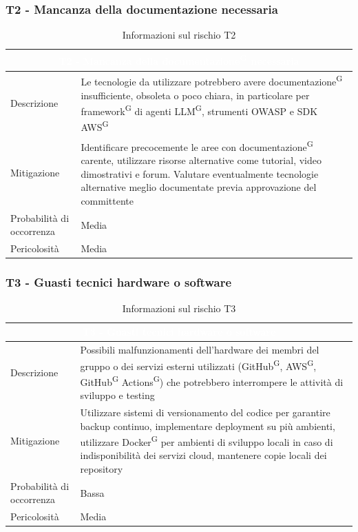 \documentclass[a4paper, 11pt]{article}
\begin{document}
\subsubsection{T2 - Mancanza della documentazione necessaria}
\begin{table}[H]
    \centering
    \begin{tabular}{|p{}|p{}|}
    	\hline
    	\multicolumn{2}{|c|}{\cellcolor{AccentColor}\textcolor{white}{\textbf{T2 - Mancanza della documentazione\textsuperscript{G} necessaria}}} \\ 
        \hline
        Descrizione & Le tecnologie da utilizzare potrebbero avere documentazione\textsuperscript{G} insufficiente, obsoleta o poco chiara, in particolare per framework\textsuperscript{G} di agenti LLM\textsuperscript{G}, strumenti OWASP e SDK AWS\textsuperscript{G} \\ 
        \hline
        Mitigazione & Identificare precocemente le aree con documentazione\textsuperscript{G} carente, utilizzare risorse alternative come tutorial, video dimostrativi e forum. Valutare eventualmente tecnologie alternative meglio documentate previa approvazione del committente \\ 
        \hline
        Probabilità di occorrenza & Media \\
        \hline
        Pericolosità & Media \\
        \hline
    \end{tabular}
    \caption{Informazioni sul rischio T2}
\end{table}

\subsubsection{T3 - Guasti tecnici hardware o software}
\begin{table}[H]
    \centering
    \begin{tabular}{|p{}|p{}|}
    	\hline
    	\multicolumn{2}{|c|}{\cellcolor{AccentColor}\textcolor{white}{\textbf{T3 - Guasti tecnici hardware o software}}} \\ 
        \hline
        Descrizione & Possibili malfunzionamenti dell'hardware dei membri del gruppo o dei servizi esterni utilizzati (GitHub\textsuperscript{G}, AWS\textsuperscript{G}, GitHub\textsuperscript{G} Actions\textsuperscript{G}) che potrebbero interrompere le attività di sviluppo e testing \\ 
        \hline
        Mitigazione & Utilizzare sistemi di versionamento del codice per garantire backup continuo, implementare deployment su più ambienti, utilizzare Docker\textsuperscript{G} per ambienti di sviluppo locali in caso di indisponibilità dei servizi cloud, mantenere copie locali dei repository \\ 
        \hline
        Probabilità di occorrenza & Bassa \\
        \hline
        Pericolosità & Media \\
        \hline
    \end{tabular}
    \caption{Informazioni sul rischio T3}
\end{table}
\end{document}
